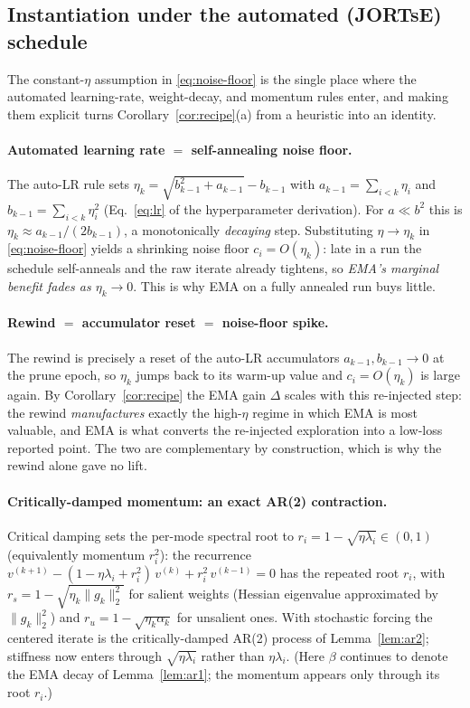 \documentclass[11pt]{article}
\theoremstyle{remark}
\begin{document}
\subsection{Instantiation under the automated (JORTsE) schedule}
\label{sec:jortse}

The constant-$\eta$ assumption in \eqref{eq:noise-floor} is the single place where
the automated learning-rate, weight-decay, and momentum rules enter, and making
them explicit turns Corollary~\ref{cor:recipe}(a) from a heuristic into an
identity.

\paragraph{Automated learning rate $=$ self-annealing noise floor.}
The auto-LR rule sets
$\eta_k=\sqrt{b_{k-1}^2+a_{k-1}}-b_{k-1}$ with
$a_{k-1}=\sum_{i<k}\eta_i$ and $b_{k-1}=\sum_{i<k}\eta_i^2$ (Eq.~\eqref{eq:lr} of
the hyperparameter derivation). For $a\ll b^2$ this is
$\eta_k\approx a_{k-1}/(2b_{k-1})$, a monotonically \emph{decaying} step.
Substituting $\eta\to\eta_k$ in \eqref{eq:noise-floor} yields a shrinking noise
floor $c_i=O(\eta_k)$: late in a run the schedule self-anneals and the raw
iterate already tightens, so \emph{EMA's marginal benefit fades as
$\eta_k\to0$}. This is why EMA on a fully annealed run buys little.

\paragraph{Rewind $=$ accumulator reset $=$ noise-floor spike.}
The rewind is precisely a reset of the auto-LR accumulators
$a_{k-1},b_{k-1}\!\to\!0$ at the prune epoch, so $\eta_k$ jumps back to its
warm-up value and $c_i=O(\eta_k)$ is large again. By Corollary~\ref{cor:recipe}
the EMA gain $\Delta$ scales with this re-injected step: the rewind
\emph{manufactures} exactly the high-$\eta$ regime in which EMA is most valuable,
and EMA is what converts the re-injected exploration into a low-loss reported
point. The two are complementary by construction, which is why the rewind alone
gave no lift.

\paragraph{Critically-damped momentum: an exact AR(2) contraction.}
Critical damping sets the per-mode spectral root to
$r_i=1-\sqrt{\eta\lambda_i}\in(0,1)$ (equivalently momentum $r_i^2$): the recurrence
$v^{(k+1)}-(1-\eta\lambda_i+r_i^2)\,v^{(k)}+r_i^2\,v^{(k-1)}=0$ has the repeated root
$r_i$, with $r_s=1-\sqrt{\eta_k\|g_k\|_2^2}$ for salient weights (Hessian eigenvalue
approximated by $\|g_k\|_2^2$) and $r_u=1-\sqrt{\eta_k\alpha_k}$ for unsalient ones.
With stochastic forcing the centered iterate is the critically-damped AR(2) process
of Lemma~\ref{lem:ar2}; stiffness now enters through $\sqrt{\eta\lambda_i}$ rather
than $\eta\lambda_i$. (Here $\beta$ continues to denote the EMA decay of
Lemma~\ref{lem:ar1}; the momentum appears only through its root $r_i$.)
\end{document}
